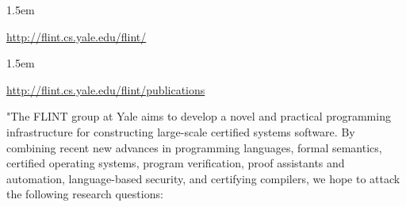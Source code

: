 \documentclass[12pt,twoside]{article}
\begin{document}
\begin{mddefinitions}%


\begin{mdbmarginx}{}{}{}{1.5em}%
\begin{mddefdata}%
\href{http://flint.cs.yale.edu/flint/}{{\ttfamily http://\hspace{0pt}flint.\hspace{0pt}cs.\hspace{0pt}yale.\hspace{0pt}edu/\hspace{0pt}flint/\hspace{0pt}}}
\end{mddefdata}%
\end{mdbmarginx}%


\begin{mdbmarginx}{}{}{}{1.5em}%
\begin{mddefdata}%
\href{http://flint.cs.yale.edu/flint/publications}{{\ttfamily http://\hspace{0pt}flint.\hspace{0pt}cs.\hspace{0pt}yale.\hspace{0pt}edu/\hspace{0pt}flint/\hspace{0pt}publications}}%
\end{mddefdata}%
\end{mdbmarginx}%
\end{mddefinitions}%

\noindent{}"The FLINT group at Yale aims to develop a novel and practical
programming infrastructure for constructing large-scale certified
systems software. By combining recent new advances in programming
languages, formal semantics, certified operating systems, program
verification, proof assistants and automation, language-based
security, and certifying compilers, we hope to attack the following
research questions:%
\end{document}

